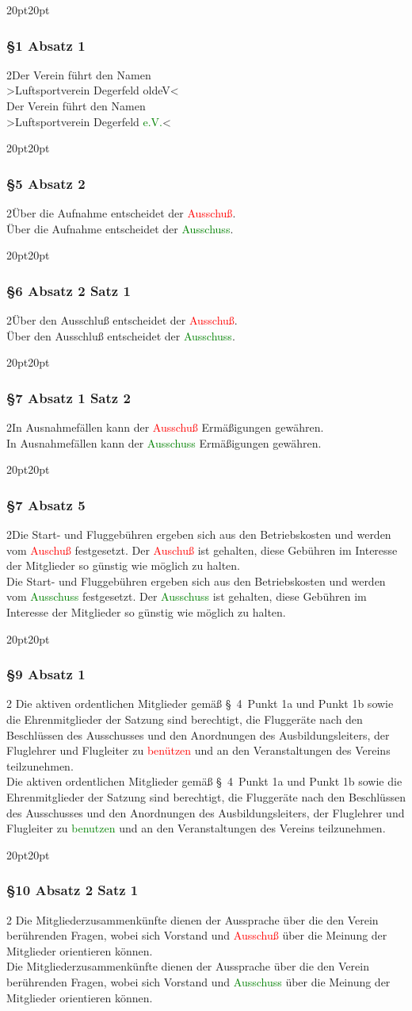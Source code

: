 \documentclass[10pt,a4paper,parskip=half]{scrartcl}
\newcommand{\new}[1]{\textcolor{Green}{#1}}
\newcommand{\old}[1]{\textcolor{Red}{#1}}
\newcommand{\change}[1]{
  \begin{adjustwidth}{20pt}{20pt}
    #1
  \end{adjustwidth}
}
\newcommand{\compare}[3]{\change{\subsubsection*{#1}\begin{multicols}{2}#2\columnbreak\\#3\end{multicols}}}
\begin{document}
  \compare{§1 Absatz 1}
  {Der Verein führt den Namen\\>Luftsportverein Degerfeld old{eV}<}
  {Der Verein führt den Namen\\>Luftsportverein Degerfeld \new{e.V.}<}

  \compare{§5 Absatz 2}{Über die Aufnahme entscheidet der \old{Ausschuß}.}{Über die Aufnahme entscheidet der \new{Ausschuss}.}

  \compare{§6 Absatz 2 Satz 1}
  {Über den Ausschluß entscheidet der \old{Ausschuß}.}
  {Über den Ausschluß entscheidet der \new{Ausschuss}.}

  \compare{§7 Absatz 1 Satz 2}
  {In Ausnahmefällen kann der \old{Ausschuß} Ermäßigungen gewähren.}
  {In Ausnahmefällen kann der \new{Ausschuss} Ermäßigungen gewähren.}

  \compare{§7 Absatz 5}
  {Die Start- und Fluggebühren ergeben sich aus den Betriebskosten und werden vom \old{Auschuß} festgesetzt.
  Der \old{Auschuß} ist gehalten,
  diese Gebühren im Interesse der Mitglieder so günstig wie möglich zu halten.}
  {Die Start- und Fluggebühren ergeben sich aus den Betriebskosten und werden vom \new{Ausschuss} festgesetzt.
  Der \new{Ausschuss} ist gehalten,
  diese Gebühren im Interesse der Mitglieder so günstig wie möglich zu halten.}

  \compare{§9 Absatz 1}{
    Die aktiven ordentlichen Mitglieder gemäß §~4~Punkt 1a und Punkt 1b
    sowie die Ehrenmitglieder der Satzung sind berechtigt,
    die Fluggeräte nach den Beschlüssen des Ausschusses und den Anordnungen des Ausbildungsleiters,
    der Fluglehrer und Flugleiter zu \old{benützen} und an den Veranstaltungen des Vereins teilzunehmen.
  }{
    Die aktiven ordentlichen Mitglieder gemäß §~4~Punkt 1a und Punkt 1b
    sowie die Ehrenmitglieder der Satzung sind berechtigt,
    die Fluggeräte nach den Beschlüssen des Ausschusses und den Anordnungen des Ausbildungsleiters,
    der Fluglehrer und Flugleiter zu \new{benutzen} und an den Veranstaltungen des Vereins teilzunehmen.
  }

  \compare{§10 Absatz 2 Satz 1}{
    Die Mitgliederzusammenkünfte dienen der Aussprache über die den Verein berührenden Fragen,
    wobei sich Vorstand und \old{Ausschuß} über die Meinung der Mitglieder orientieren können.
  }{
    Die Mitgliederzusammenkünfte dienen der Aussprache über die den Verein berührenden Fragen,
    wobei sich Vorstand und \new{Ausschuss} über die Meinung der Mitglieder orientieren können.
  }
\end{document}
